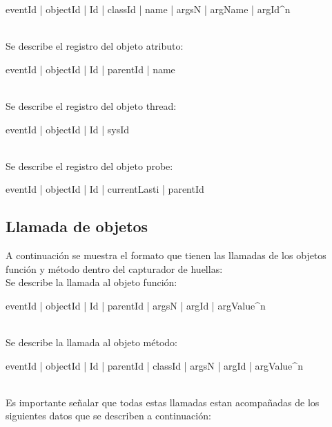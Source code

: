 \documentclass[10pt,a4paper]{article}
\begin{document}
\begin{boxedverbatim}
eventId | objectId | Id | classId | name | argsN | {argName | argId}^n
\end{boxedverbatim}
\\

Se describe el registro del objeto atributo:\\

\begin{boxedverbatim}
eventId | objectId | Id | parentId | name
\end{boxedverbatim}
\\

Se describe el registro del objeto thread: \\

\begin{boxedverbatim}
eventId | objectId | Id | sysId
\end{boxedverbatim}
\\

Se describe el registro del objeto probe: \\

\begin{boxedverbatim}
eventId | objectId | Id | currentLasti | parentId
\end{boxedverbatim}

\subsection{Llamada de objetos}

A continuación se muestra el formato que tienen las llamadas de los objetos función y método dentro del capturador de huellas:\\

Se describe la llamada al objeto función:\\

\begin{boxedverbatim}
eventId | objectId | Id | parentId | argsN | {argId | argValue}^n
\end{boxedverbatim}
\\

Se describe la llamada al objeto método:\\

\begin{boxedverbatim}
eventId | objectId | Id | parentId | classId | argsN | {argId | argValue}^n
\end{boxedverbatim}
\\
Es importante señalar que todas estas llamadas estan acompañadas de los siguientes datos que se describen a continuación:\\
\end{document}
